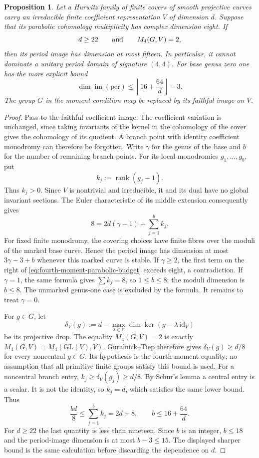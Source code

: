 \documentclass[11pt]{article}
\newtheorem{proposition}[theorem]{Proposition}
\theoremstyle{definition}
\theoremstyle{remark}
\begin{document}
\begin{proposition}\label{prop:fourth-moment-cover}
Let a Hurwitz family of finite covers of smooth projective curves carry
an irreducible finite coefficient representation $V$ of dimension $d$.
Suppose that its parabolic cohomology multiplicity has complex dimension
eight.  If
\[
 d\ge22\qquad\hbox{and}\qquad M_4(G,V)=2,
\]
then its period image has dimension at most fifteen.  In particular, it
cannot dominate a unitary period domain of signature $(4,4)$.
For base genus zero one has the more explicit bound
\[
 \dim\operatorname{im}(\mathrm{per})
 \le \left\lfloor16+\frac{64}{d}\right\rfloor-3.
\]
The group $G$ in the moment condition may be replaced by its faithful image
on $V$.
\end{proposition}

\begin{proof}
Pass to the faithful coefficient image.  The coefficient variation is
unchanged, since taking invariants of the kernel in the cohomology of the
cover gives the cohomology of its quotient.  A branch point with identity
coefficient monodromy can therefore be forgotten.  Write $\gamma$ for the
genus of the base and $b$ for the number of remaining branch points.  For
its local monodromies $g_1,\dots,g_b$, put
\[
 k_j:=\operatorname{rank}(g_j-1).
\]
Thus $k_j>0$.  Since $V$ is nontrivial and irreducible, it and its dual have
no global invariant sections.  The Euler characteristic of its middle
extension consequently gives
\begin{equation}\label{eq:fourth-moment-parabolic-budget}
 8=2d(\gamma-1)+\sum_{j=1}^{b}k_j.
\end{equation}
For fixed finite monodromy, the covering choices have finite fibres over
the moduli of the marked base curve.  Hence the period image has dimension
at most $3\gamma-3+b$ whenever this marked curve is stable.
If $\gamma\ge2$, the first term on the right of
\eqref{eq:fourth-moment-parabolic-budget} exceeds eight, a contradiction.
If $\gamma=1$, the same formula gives $\sum k_j=8$, so $1\le b\le8$;
the moduli dimension is $b\le8$.  The unmarked genus-one case is excluded
by the formula.  It remains to treat $\gamma=0$.

For $g\in G$, let
\[
 \delta_V(g):=d-\max_{\lambda\in\mathbb C}
                      \dim\ker(g-\lambda\,\mathrm{id}_V)
\]
be its projective drop.  The equality $M_4(G,V)=2$ is exactly
$M_4(G,V)=M_4(\mathrm{GL}(V),V)$.  Guralnick--Tiep
\cite[Theorem~1.7, p.~142]{GTtensor} therefore gives
$\delta_V(g)\ge d/8$ for every noncentral $g\in G$.
Its hypothesis is the fourth-moment equality; no assumption that all
primitive finite groups satisfy this bound is used.
For a noncentral branch entry,
$k_j\ge\delta_V(g_j)\ge d/8$.  By Schur's lemma a central entry is a
scalar.  It is not the identity, so $k_j=d$, which satisfies the same
lower bound.  Thus
\[
 \frac{bd}{8}\le\sum_{j=1}^{b}k_j=2d+8,
 \qquad b\le16+\frac{64}{d}.
\]
For $d\ge22$ the last quantity is less than nineteen.  Since $b$ is an
integer, $b\le18$ and the period-image dimension is at most $b-3\le15$.
The displayed sharper bound is the same calculation before discarding
the dependence on $d$.
\end{proof}
\end{document}
